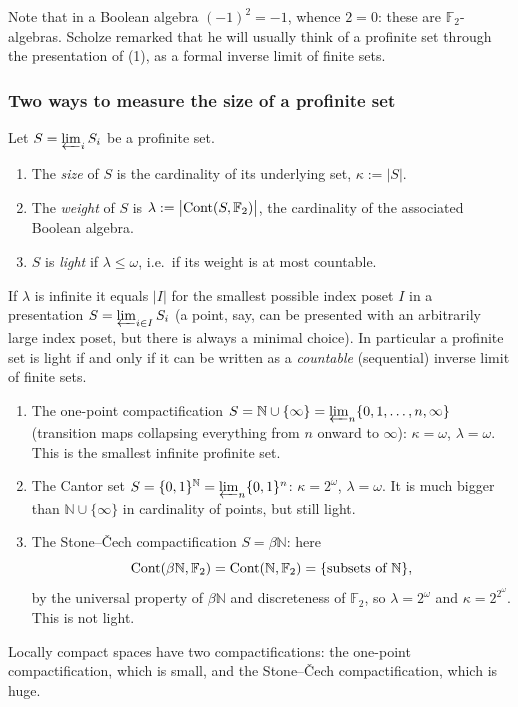 Note that in a Boolean algebra $(-1)^2=-1$, whence $2=0$: these are
$\mathbb{F}_2$-algebras. Scholze remarked that he will usually think of a
profinite set through the presentation of (1), as a
formal inverse limit of finite sets.

\subsubsection*{Two ways to measure the size of a profinite set}

\begin{definition}
\label{def:2:size-weight}
Let $S=\varprojlim_i S_i$ be a profinite set.
\begin{enumerate}
\item The \emph{size} of $S$ is the cardinality of its underlying set,
$\kappa:=|S|$.
\item The \emph{weight} of $S$ is $\lambda:=\bigl|\operatorname{Cont}(S,\mathbb{F}_2)\bigr|$,
the cardinality of the associated Boolean algebra.
\item $S$ is \emph{light} if $\lambda\le\omega$, i.e.\ if its weight is at most
countable.
\end{enumerate}
\end{definition}

\begin{remark}
\label{rmk:2:weight-index}
If $\lambda$ is infinite it equals $|I|$ for the smallest possible index poset
$I$ in a presentation $S=\varprojlim_{i\in I}S_i$ (a point, say, can be presented
with an arbitrarily large index poset, but there is always a minimal choice). In
particular a profinite set is light if and only if it can be written as a
\emph{countable} (sequential) inverse limit of finite sets.
\end{remark}

\begin{example}
\label{ex:2:size-weight}
\begin{enumerate}
\item The one-point compactification $S=\mathbb{N}\cup\{\infty\}=\varprojlim_n
\{0,1,\dots,n,\infty\}$ (transition maps collapsing everything from $n$ onward to
$\infty$): $\kappa=\omega$, $\lambda=\omega$. This is the smallest infinite
profinite set.
\item The Cantor set $S=\{0,1\}^{\mathbb{N}}=\varprojlim_n\{0,1\}^n$:
$\kappa=2^{\omega}$, $\lambda=\omega$. It is much bigger than
$\mathbb{N}\cup\{\infty\}$ in cardinality of points, but still light.
\item The Stone--\v{C}ech compactification $S=\beta\mathbb{N}$: here
\[
\operatorname{Cont}(\beta\mathbb{N},\mathbb{F}_2)=\operatorname{Cont}(\mathbb{N},\mathbb{F}_2)
=\{\text{subsets of }\mathbb{N}\},
\]
by the universal property of $\beta\mathbb{N}$ and discreteness of $\mathbb{F}_2$,
so $\lambda=2^{\omega}$ and $\kappa=2^{2^{\omega}}$. This is not light.
\end{enumerate}
Locally compact spaces have two compactifications: the one-point compactification,
which is small, and the Stone--\v{C}ech compactification, which is huge.
\end{example}

